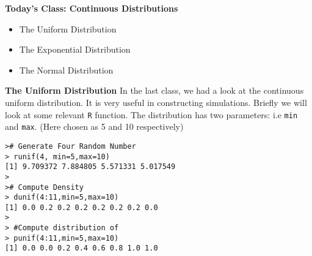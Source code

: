 

\textbf{Today's Class: Continuous Distributions}
\begin{itemize}
\item The Uniform Distribution
\item The Exponential Distribution
\item The Normal Distribution
\end{itemize}
\medskip

\textbf{The Uniform Distribution}
In the last class, we had a look at the continuous uniform distribution. It is very useful in constructing simulations. Briefly we will look at some relevant \texttt{R} function.
The distribution has two parameters: i.e \texttt{min} and \texttt{max}. (Here chosen as 5 and 10 respectively)
\begin{verbatim}
># Generate Four Random Number
> runif(4, min=5,max=10)
[1] 9.709372 7.884805 5.571331 5.017549
>
># Compute Density
> dunif(4:11,min=5,max=10)
[1] 0.0 0.2 0.2 0.2 0.2 0.2 0.2 0.0
>
> #Compute distribution of
> punif(4:11,min=5,max=10)
[1] 0.0 0.0 0.2 0.4 0.6 0.8 1.0 1.0
\end{verbatim}

\medskip


                             
